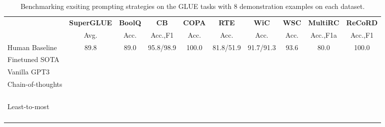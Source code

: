 \begin{table*}[]
\small
    \centering
    \begin{tabular}{lccccccccc}
    \toprule
     ~ & \bf SuperGLUE & \bf BoolQ & \bf CB  & \bf COPA & \bf RTE  & \bf WiC  & \bf WSC  & \bf MultiRC & \bf  ReCoRD \\
 ~& Avg. & Acc. & Acc.,F1 & Acc. & Acc. &
 Acc.  & Acc. & Acc.,F1a & Acc.,F1\\
     \midrule
     Human Baseline & 89.8  & 89.0  & 95.8/98.9  & 100.0  & 81.8/51.9  & 91.7/91.3  & 93.6  & 80.0 & 100.0   \\
     Finetuned SOTA \\
     Vanilla GPT3  &   &  &   & \\
    \makecell[l]{Chain-of-thoughts \\ ~\cite{beyond}}   &   & &   & \\
    \makecell[l]{Least-to-most\\ ~\cite{suzgun2022challenging}}   & &  &   & \\
    \bottomrule
    \end{tabular}
    \caption{Benchmarking exsiting prompting strategies on the GLUE tasks with 8 demonstration examples on each dataset.}
    \label{tab:evaluation}
\end{table*}